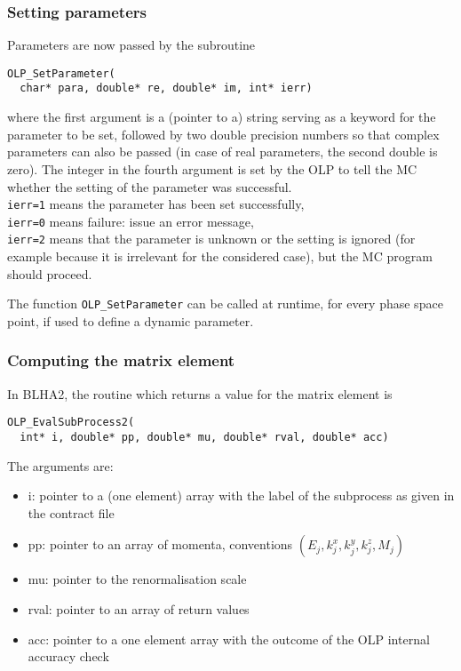 \subsubsection{Setting parameters}
Parameters are now passed by the subroutine
\begin{lstlisting}[style=C]
OLP_SetParameter(
  char* para, double* re, double* im, int* ierr)
\end{lstlisting}
where the first argument is a (pointer to a) string serving as a keyword 
for the parameter to be set, followed by two double precision numbers
so that complex parameters can also be passed (in case of real parameters, 
the second double is zero). The integer in the fourth argument 
is set by the OLP to tell the MC whether the setting of the parameter 
was successful.\\
{\tt ierr=1} means the parameter has been set successfully, \\
{\tt ierr=0} means failure: issue an error message, \\
{\tt ierr=2} means that the parameter is unknown 
or the setting is ignored (for example because it is irrelevant 
for the considered case), but the MC program should proceed.


The function {\tt OLP\_SetParameter} can be called at runtime, 
for every phase space point, 
if used to define a dynamic parameter. 

\subsubsection{Computing the matrix element}

In BLHA2, the routine which returns a value for the matrix element is
\begin{lstlisting}[style=C]
OLP_EvalSubProcess2(
  int* i, double* pp, double* mu, double* rval, double* acc)
\end{lstlisting}


The arguments are:
\begin{itemize}
\item i: pointer to a (one element) array with the label of the subprocess as given in the contract file
\item pp: pointer to an array of momenta, conventions $(E_j,k_j^x,k_j^y,k_j^z,M_j)$
\item mu: pointer to the renormalisation scale 
\item rval: pointer to an array of return values
\item acc: pointer to a one element array with the outcome of the 
OLP internal accuracy check 
\end{itemize}


